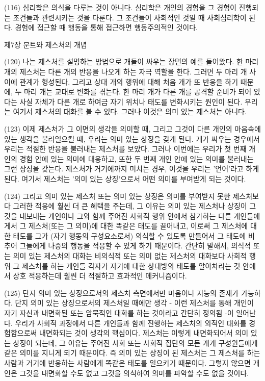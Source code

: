 \documentclass[11pt, a4paper]{article}
\begin{document}
(116) 심리학은 의식을 다루는 것이 아니다. 심리학은 개인의 경험을 그 경험이 진행되는 조건들과 관련시키는 것을 다룬다. 그 조건들이 사회적인 것일 때 사회심리학이 된다. 경험에 접근할 때 행동을 통해 접근하면 행동주의적인 것이다.

제7장 분트와 제스처의 개념

(120) 나는 제스처를 설명하는 방법으로 개들이 싸우는 장면의 예를 들어왔다. 한 마리 개의 제스처는 다른 개의 반응을 나오게 하는 자극 역할을 한다. 그러면 두 마리 개 사이에 관계가 형성된다. 그리고 상대 개의 행위에 대해 처음 개가 또 반응을 하기 때문에, 두 마리 개는 교대로 변화를 겪는다. 한 마리 개가 다른 개를 공격할 준비가 되어 있다는 사실 자체가 다른 개로 하여금 자기 위치나 태도를 변화시키는 원인이 된다. 우리는 여기서 제스처의 대화를 볼 수 있다. 그러나 이것은 의미 있는 제스처는 아니다.

(123) 이제 제스처가 그 이면의 생각을 의미할 때, 그리고 그것이 다른 개인의 마음속에 있는 생각을 불러일으킬 때, 우리는 의미 있는 상징을 갖게 된다. 개가 싸우는 경우에서 우리는 적절한 반응을 불러내는 제스처를 보았다. 그러나 이번에는 우리가 첫 번째 개인의 경험 안에 있는 의미에 대응하고, 또한 두 번째 개인 안에 있는 의미를 불러내는 그런 상징을 갖는다. 제스처가 거기에까지 미치는 경우, 이것을 우리는 '언어'라고 하게 된다. 여기서 제스처는 '의미 있는 상징'으로서 어떤 의미를 부여받게 되는 것이다.

(124) 그리고 의미 있는 제스처 또는 의미 있는 상징은 의미를 부여받지 못한 제스처보다 그러한 적응에 훨씬 더 큰 혜택을 주는데, 그 이유는 의미 있는 제스처나 상징이 그것을 내보내는 개인이나 그와 함께 주어진 사회적 행위 안에서 참가하는 다른 개인들에게서 그 제스처(또는 그 의미)에 대한 똑같은 태도를 끌어내고, 이로써 그 제스처에 대한 태도를 그가 (자기 행동의 구성요소로서) 의식할 수 있도록 만들어서 그 태도에 비추어 그들에게 나중의 행동을 적응할 수 있게 하기 때문이다. 간단히 말해서, 의식적 또는 의미 있는 제스처의 대화는 비의식적 또는 의미 없는 제스처의 대화보다 사회적 행위-그 제스처를 하는 개인들 각자가 자기에 대한 상대방의 태도를 알아차리는 것-안에서 상호 적응하는데 훨씬 더 적절하고 효과적인 메커니즘이다.

(125) 단지 의미 있는 상징으로서의 제스처 측면에서만 마음이나 지능의 존재가 가능하다. 단지 의미 있는 상징으로서의 제스처일 때에만 생각 - 이런 제스처를 통해 개인이 자기 자신과 내면화된 또는 암묵적인 대화를 하는 것이라고 간단히 정의됨 -이 일어난다. 우리가 사회적 과정에서 다른 개인들과 함께 진행하는 제스처의 외적인 대화를 경험함으로써 내면화되는 것이 생각의 핵심이다. 제스처는 이렇게 내면화되어서 의미 있는 상징이 되는데, 그 이유는 주어진 사회 또는 사회적 집단의 모든 개개 구성원들에게 같은 의미를 지니게 되기 때문이다. 즉 의미 있는 상징이 된 제스처는 그 제스처를 하는 사람과 거기에 반응하는 사람에게 똑같은 태도를 일으키기 때문이다. 그렇지 않으면 개인은 그것을 내면화할 수도 없고 그것을 의식하여 의미를 파악할 수도 없을 것이다.
\end{document}
